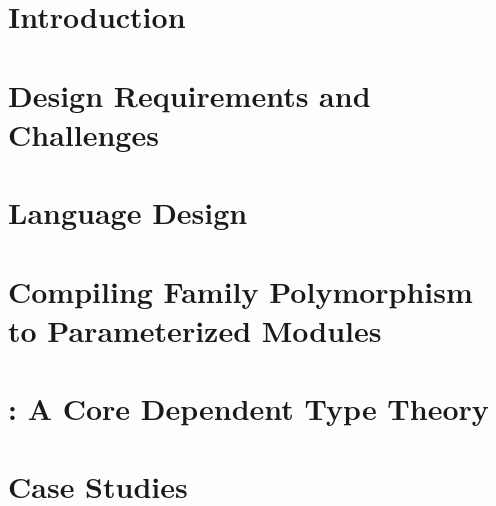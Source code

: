 \begin{abstract}

\end{abstract}

\maketitle

\section{Introduction}
\label{sec:intro}



\section{Design Requirements and Challenges}
\label{sec:background+challenge}


\section{Language Design}
\label{sec:lang-design}


\section{Compiling Family Polymorphism to Parameterized Modules}
\label{sec:coqimpl}


\section{\TT: A Core Dependent Type Theory}
\label{sec:metatheory2}



\section{Case Studies}
\label{sec:casestudies}


